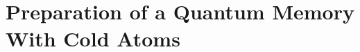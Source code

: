 \documentclass[a4paper,epsfig,12pt,twoside,openright]{brahim}
\begin{document}
\part{Preparation of a Quantum Memory With Cold Atoms}
\label{part:3} 





\appendix


\backmatter


\cleardoublepage
{}
{}

 

\end{document}
